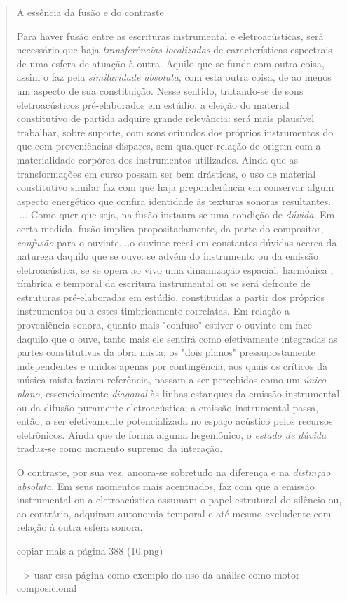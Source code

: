 \documentclass{ppgmus}
\begin{document}
\begin{quotation}

A essência da fusão e do contraste

Para haver fusão entre as escrituras instrumental e eletroacústicas,
será necessário que haja \textit{transferências localizadas} de 
características espectrais de uma esfera de atuação à outra.
Aquilo que se funde com outra coisa, assim o faz pela \textit{similaridade
absoluta}, com esta outra coisa, de ao menos um aspecto de sua 
constituição. Nesse sentido, tratando-se de sons eletroacústicos 
pré-elaborados em estúdio, a eleição do material constitutivo de partida
adquire grande relevância: será mais plausível trabalhar, sobre suporte,
com sons oriundos dos próprios instrumentos do que com proveniências
díspares, sem qualquer relação de origem com a materialidade corpórea
dos instrumentos utilizados. Ainda que as transformações em curso possam ser
bem drásticas, o uso de material constitutivo similar faz com que
haja preponderância em conservar algum aspecto energético que confira
identidade às texturas sonoras resultantes.
....
Como quer que seja, na fusão instaura-se uma condição de \textit{dúvida}.
Em certa medida, fusão implica propositadamente, da parte do compositor,
\textit{confusão} para o ouvinte....o ouvinte recai em constantes dúvidas
acerca da natureza daquilo que se ouve: se advém do instrumento ou da 
emissão eletroacústica, se se opera ao vivo uma dinamização espacial, harmônica
, tímbrica e temporal da escritura instrumental ou se será defronte de
estruturas pré-elaboradas em estúdio, constituidas a partir dos próprios
instrumentos ou a estes timbricamente correlatas. Em relação a proveniência
sonora, quanto mais "confuso" estiver o ouvinte em face daquilo que
o ouve, tanto mais ele sentirá como efetivamente integradas as partes
constitutivas da obra mista; os "dois planos" pressupostamente independentes
e unidos apenas por contingência, aos quais os críticos da música mista
faziam referência, passam a ser percebidos como um \textit{único plano},
essencialmente \textit{diagonal} às linhas estanques da emissão instrumental
ou da difusão puramente eletroacústica; a emissão instrumental passa,
então, a ser efetivamente potencializada no espaço acústico pelos recursos 
eletrônicos. Ainda que de forma alguma hegemônico, o \textit{estado de
dúvida} traduz-se como momento supremo da interação.

O contraste, por sua vez, ancora-se sobretudo na diferença e na 
\textit{distinção absoluta}. Em seus momentos mais acentuados, faz com
que a emissão instrumental ou a eletroacústica assumam o papel estrutural
do silêncio ou, ao contrário, adquiram autonomia temporal e até mesmo
excludente com relação à outra esfera sonora.


copiar mais a página 388 (10.png)

- > usar essa página como exemplo do uso da análise como motor 
composicional

\end{quotation}
\end{document}
